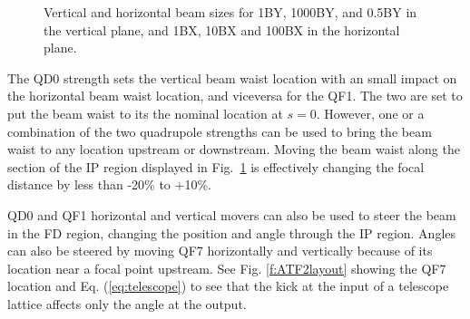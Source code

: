 {{\begin{figure}[h]
\begin{center}
  \caption{Vertical and horizontal beam sizes for 1BY, 1000BY, and 0.5BY in the vertical plane, and 1BX, 10BX and 100BX in the horizontal plane.}\label{f:BXYoptics}
 \end{center}
\end{figure}
The QD0 strength sets the vertical beam waist location with an small impact on the horizontal beam waist location, and viceversa for the QF1. The two are set to put the beam waist to its the nominal location at $s=0$. However, one or a combination of the two quadrupole strengths can be used to bring the beam waist to any location upstream or downstream. Moving the beam waist along the section of the IP region displayed in Fig.~\ref{f:BXYoptics} is effectively changing the focal distance by less than -20\% to +10\%.\par
QD0 and QF1 horizontal and vertical movers can also be used to steer the beam in the FD region, changing the position and angle through the IP region. Angles can also be steered by moving QF7 horizontally and vertically because of its location near a focal point upstream. See Fig. \ref{f:ATF2layout} showing the QF7 location and Eq. (\ref{eq:telescope}) to see that the kick at the input of a telescope lattice affects only the angle at the output.\par

}}
